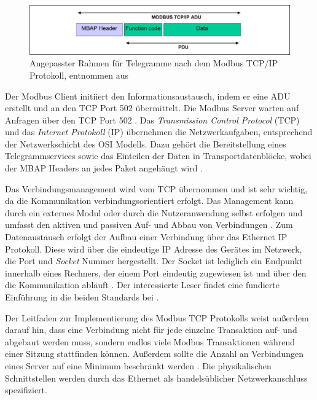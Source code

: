 \begin{figure}
\centering
\includegraphics[width=\textwidth]{abbildungen/20160322_tcpframe}
\caption[Angepasster Rahmen für Telegramme nach dem Modbus TCP/IP Protokoll]{Angepasster Rahmen für Telegramme nach dem Modbus TCP/IP Protokoll, entnommen aus \cite[S.~4]{mod06tcp}}
\label{fig:modbustcpframe}
\end{figure}

Der Modbus Client initiiert den Informationsaustausch, indem er eine ADU erstellt und an den TCP Port 502 übermittelt. Die Modbus Server warten auf Anfragen über den TCP Port 502
\cite[S.~7f.]{mod06tcp}.
Das \textit{Transmission Control Protocol} (TCP) und das \textit{Internet Protokoll} (IP) übernehmen die Netzwerkaufgaben, entsprechend der Netzwerkschicht des OSI Modells. Dazu gehört die Bereitstellung eines Telegrammservices sowie das Einteilen der Daten in Transportdatenblöcke, wobei der MBAP Headers an jedes Paket angehängt wird \cite[S.~7ff.]{mod06tcp}.

Das Verbindungsmanagement wird vom TCP übernommen und ist sehr wichtig, da die Kommunikation verbindungsorientiert erfolgt.
Das Management kann durch ein externes Modul oder durch die Nutzeranwendung selbst erfolgen und umfasst den aktiven und passiven Auf- und Abbau von Verbindungen \cite[S.~11ff.]{mod06tcp}.
Zum Datenaustausch erfolgt der Aufbau einer Verbindung über das Ethernet IP Protokoll. Diese wird über die eindeutige IP Adresse des Gerätes im Netzwerk, die Port und \textit{Socket} Nummer hergestellt. Der Socket ist lediglich ein Endpunkt innerhalb eines Rechners, der einem Port eindeutig zugewiesen ist und über den die Kommunikation abläuft \cite[S.~15f.]{mod06tcp}.
Der interessierte Leser findet eine fundierte Einführung in die beiden Standards bei \cite{fu03}.

Der Leitfaden zur Implementierung des Modbus TCP Protokolls weist außerdem darauf hin, dass eine Verbindung nicht für jede einzelne Transaktion auf- und abgebaut werden muss, sondern endlos viele Modbus Transaktionen während einer Sitzung stattfinden können. Außerdem sollte die Anzahl an Verbindungen eines Server auf eine Minimum beschränkt werden \cite[S.~9f.]{mod06tcp}. Die physikalischen Schnittstellen werden durch das Ethernet als handelsüblicher Netzwerkanschluss spezifiziert.


